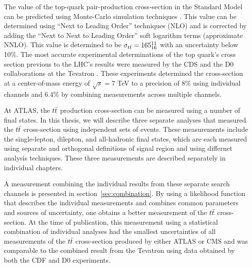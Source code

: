 The value of the top-quark pair-production cross-section in the Standard Model can be predicted using Monte-Carlo simulation techniques \cite{TOP_XSC_THEORY} \cite{Langenfeld:2009ue} \cite{THRESHOLD_EXPANSION_XSC}.
This value can be determined using ``Next to Leading Order'' techniques (NLO) and is corrected by adding the ``Next to Next to Leading Order'' soft logarithm terms (approximate NNLO).
This value is determined to be $\sigma_{t\bar{t}} = 165^{11}_{16}$ with an uncertainty below 10\%.
The most accurate experimental determinations of the top quark's cross section previous to the LHC's results were measured by the CDS and the D0 collaborations at the Tevatron \cite{TEVATRON_XSC_LJETS} \cite{TEVATRON_XSC_DILEP}.
These experiments determined the cross-section at a center-of-mass energy of $\sqrt{s} = 7$ TeV to a precision of 8\% using individual channels and 6.4\% by combining measurements across multiple channels.

At ATLAS, the $t\bar{t}$ production cross-section can be measured using a number of final states.
In this thesis, we will describe three separate analyses that measured the $t\bar{t}$ cross-section using independent sets of events.
These measurements include the single-lepton, dilepton, and all-hadronic final states, which are each measured using separate and orthogonal
definitions of signal region and using differnet analysis techniques.
These three measurements are described separately in individual chapters.

A measurement combining the individual results from these separate search channels is presented in section~\ref{sec:combination}.
By using a likelihood function that describes the individual measurements and combines common parameters and sources of uncertainty,
one obtains a better measurement of the $t\bar{t}$ cross-section.
At the time of publication, this measurement using a statistical combination of individual analyses had the smallest uncertainties
of all measurements of the $t\bar{t}$ cross-section produced by either ATLAS or CMS and was comparable to the combined result from 
the Tevatron using data obtained by both the CDF and D0 experiments.


